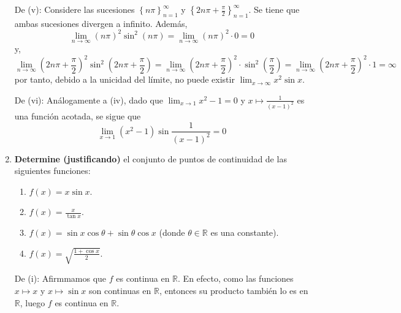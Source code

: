 \documentclass[12pt]{article}
\begin{document}
\begin{enumerate}
\begin{sol}
        De (v): Considere las sucesiones $\left\{n\pi \right\}_{ n=1}^\infty$ y $\left\{2n\pi+\frac{\pi}{2} \right\}_{ n=1}^\infty$. Se tiene que ambas sucesiones divergen a infinito. Además,
        \begin{equation*}
            \lim_{n\rightarrow\infty}(n\pi)^2\sin^2(n\pi)=\lim_{n\rightarrow\infty}(n\pi)^2\cdot 0=0
        \end{equation*}
        y,
        \begin{equation*}
            \lim_{n\rightarrow\infty}\left(2n\pi+\frac{\pi}{2}\right)^2\sin^2(2n\pi+\frac{\pi}{2})=\lim_{n\rightarrow\infty}\left(2n\pi+\frac{\pi}{2}\right)^2\cdot\sin^2(\frac{\pi}{2})=\lim_{n\rightarrow\infty}\left(2n\pi+\frac{\pi}{2}\right)^2\cdot1=\infty
        \end{equation*}
        por tanto, debido a la unicidad del límite, no puede existir $\lim_{ x\rightarrow\infty}x^2\sin x$.

        De (vi): Análogamente a (iv), dado que $\lim_{ x\rightarrow 1}x^2-1=0$ y $x\mapsto\frac{1}{(x-1)^2}$ es una función acotada, se sigue que
        \begin{equation*}
            \lim_{ x\rightarrow 1}(x^2-1)\sin\frac{1}{(x-1)^2}=0
        \end{equation*}
    \end{sol}

    \item \textbf{Determine (justificando)} el conjunto de puntos de continuidad de las siguientes funciones:
    \begin{enumerate}
        \item $f(x)=x\sin x$.
        \item $f(x)=\frac{x}{\tan x}$.
        \item $f(x)=\sin x\cos\theta+\sin\theta\cos x$ (donde $\theta\in\mathbb{R}$ es una constante).
        \item $f(x)=\sqrt{\frac{1+\cos x}{2}}$.
    \end{enumerate}

    \begin{sol}
        De (i): Afirmmamos que $f$ es continua en $\mathbb{R}$. En efecto, como las funciones $x\mapsto x$ y $x\mapsto \sin x$ son continuas en $\mathbb{R}$, entonces su producto también lo es en $\mathbb{R}$, luego $f$ es continua en $\mathbb{R}$.


\end{sol}
\end{enumerate}
\end{document}
